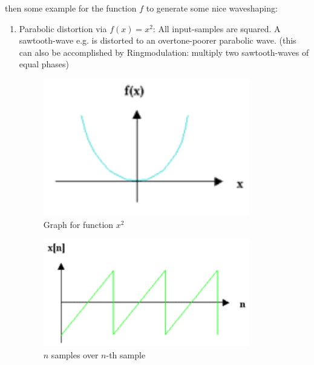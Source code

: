 \begin{example}
	then some example for the function $f$ to generate some nice waveshaping:
	\begin{enumerate}
		\item Parabolic distortion via $f(x)=x^2$: All input-samples are squared. A sawtooth-wave e.g. is distorted to an overtone-poorer parabolic wave. (this can also be accomplished by Ringmodulation: multiply two sawtooth-waves of equal phases)
		\bigskip %
		\begin{figure}[ht!]
			\centering
			\includegraphics[width=90mm]{pics/parabolic_1.png}
			\caption{Graph for function $x^2$}
			\label{graph_quad}
		\end{figure}
		\bigskip %
		\begin{figure}[ht!]
			\centering
			\includegraphics[width=90mm]{pics/parabolic_2.png}
			\caption{$n$ samples over $n$-th sample}
			\label{graph_samples}
		\end{figure}
		\bigskip %

\end{enumerate}
\end{example}
